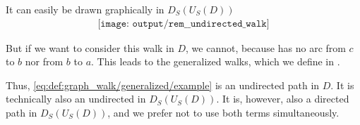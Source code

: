 \begin{remark}
  It can easily be drawn graphically in \( D_S(U_S(D)) \)
  \begin{equation*}
    \begin{aligned}
      \texttt{[image: output/rem\_\_undirected\_walk]}
    \end{aligned}
  \end{equation*}

  But if we want to consider this walk in \( D \), we cannot, because has no arc from \( c \) to \( b \) nor from \( b \) to \( a \). This leads to the generalized walks, which we define in .

  Thus, \eqref{eq:def:graph_walk/generalized/example} is an undirected path in \( D \). It is technically also an undirected in \( D_S(U_S(D)) \). It is, however, also a directed path in \( D_S(U_S(D)) \), and we prefer not to use both terms simultaneously.
\end{remark}

